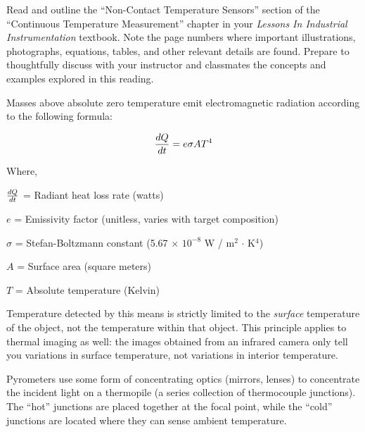 

Read and outline the ``Non-Contact Temperature Sensors'' section of the ``Continuous Temperature Measurement'' chapter in your {\it Lessons In Industrial Instrumentation} textbook.  Note the page numbers where important illustrations, photographs, equations, tables, and other relevant details are found.  Prepare to thoughtfully discuss with your instructor and classmates the concepts and examples explored in this reading.














Masses above absolute zero temperature emit electromagnetic radiation according to the following formula:

$${dQ \over dt} = e \sigma A T^4$$

\noindent
Where,

$dQ \over dt$ = Radiant heat loss rate (watts)

$e$ = Emissivity factor (unitless, varies with target composition)

$\sigma$ = Stefan-Boltzmann constant (5.67 $\times$ $10^{-8}$ W / m$^{2}$ $\cdot$ K$^{4}$)

$A$ = Surface area (square meters)

$T$ = Absolute temperature (Kelvin)

\vskip 10pt

Temperature detected by this means is strictly limited to the {\it surface} temperature of the object, not the temperature within that object.  This principle applies to thermal imaging as well: the images obtained from an infrared camera only tell you variations in surface temperature, not variations in interior temperature.

\vskip 10pt

Pyrometers use some form of concentrating optics (mirrors, lenses) to concentrate the incident light on a thermopile (a series collection of thermocouple junctions).  The ``hot'' junctions are placed together at the focal point, while the ``cold'' junctions are located where they can sense ambient temperature.

